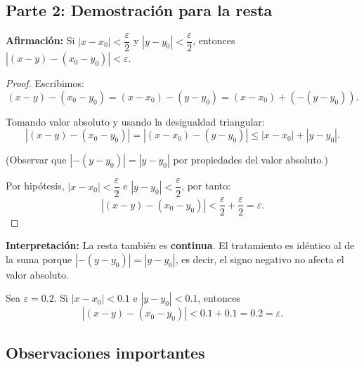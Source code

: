 \subsection*{Parte 2: Demostración para la resta}

\textbf{Afirmación:} Si $|x - x_0| < \dfrac{\varepsilon}{2}$ y $|y - y_0| < \dfrac{\varepsilon}{2}$, entonces $|(x - y) - (x_0 - y_0)| < \varepsilon$.

\begin{proof}
Escribimos:
\[
(x - y) - (x_0 - y_0) = (x - x_0) - (y - y_0) = (x - x_0) + (-(y - y_0)).
\]

Tomando valor absoluto y usando la desigualdad triangular:
\[
|(x - y) - (x_0 - y_0)| = |(x - x_0) - (y - y_0)| \leq |x - x_0| + |y - y_0|.
\]

(Observar que $|-(y - y_0)| = |y - y_0|$ por propiedades del valor absoluto.)

Por hipótesis, $|x - x_0| < \dfrac{\varepsilon}{2}$ e $|y - y_0| < \dfrac{\varepsilon}{2}$, por tanto:
\[
|(x - y) - (x_0 - y_0)| < \frac{\varepsilon}{2} + \frac{\varepsilon}{2} = \varepsilon.
\]
\end{proof}

\textbf{Interpretación:} La resta también es \textbf{continua}. El tratamiento es idéntico al de la suma porque $|-(y - y_0)| = |y - y_0|$, es decir, el signo negativo no afecta el valor absoluto.

\begin{ejemplo}
Sea $\varepsilon = 0.2$. Si $|x - x_0| < 0.1$ e $|y - y_0| < 0.1$, entonces
\[
|(x - y) - (x_0 - y_0)| < 0.1 + 0.1 = 0.2 = \varepsilon.
\]
\end{ejemplo}

\subsection*{Observaciones importantes}


